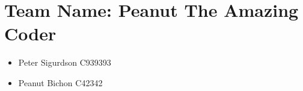  \section{Team Name: Peanut The Amazing Coder}
 
 \begin{itemize}
     \item Peter Sigurdson C939393
     \item Peanut Bichon C42342
 \end{itemize}